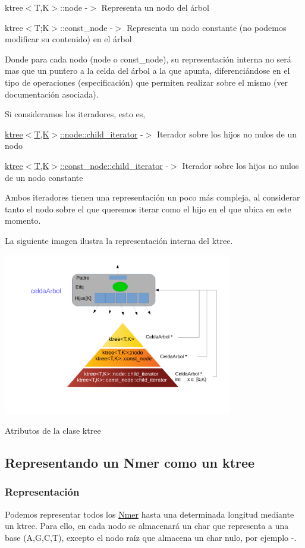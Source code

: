 \begin{DoxyItemize}
\item ktree$<$\+T,\+K$>$\+::node -\/$>$ Representa un nodo del árbol \item ktree$<$T;K$>$\+::const\+\_\+node -\/$>$ Representa un nodo constante (no podemos modificar su contenido) en el árbol\end{DoxyItemize}
Donde para cada nodo (node o const\+\_\+node), su representación interna no será mas que un puntero a la celda del árbol a la que apunta, diferenciándose en el tipo de operaciones (especificación) que permiten realizar sobre el mismo (ver documentación asociada).

Si consideramos los iteradores, esto es,

\begin{DoxyItemize}
\item \hyperlink{classktree_1_1node_afa2e7c16e38c1a4a062930d167b02a7f}{ktree$<$\+T,\+K$>$\+::node\+::child\+\_\+iterator} -\/$>$ Iterador sobre los hijos no nulos de un nodo \item \hyperlink{classktree_1_1const__node_afa2e7c16e38c1a4a062930d167b02a7f}{ktree$<$\+T,\+K$>$\+::const\+\_\+node\+::child\+\_\+iterator} -\/$>$ Iterador sobre los hijos no nulos de un nodo constante\end{DoxyItemize}
Ambos iteradores tienen una representación un poco más compleja, al considerar tanto el nodo sobre el que queremos iterar como el hijo en el que ubica en este momento.

La siguiente imagen ilustra la representación interna del ktree.

 
\begin{DoxyImage}
\includegraphics[width=10cm]{ktree_estructura}
\caption{Atributos de la clase ktree}
\end{DoxyImage}
\hypertarget{index_ktreegen}{}\subsection{Representando un Nmer como un ktree}\label{index_ktreegen}
\hypertarget{index_rep}{}\subsubsection{Representación}\label{index_rep}
Podemos representar todos los \hyperlink{classNmer}{Nmer} hasta una determinada longitud mediante un ktree. Para ello, en cada nodo se almacenará un char que representa a una base (A,G,C,T), excepto el nodo raíz que almacena un char nulo, por ejemplo \textquotesingle{}-\/\textquotesingle{}.

